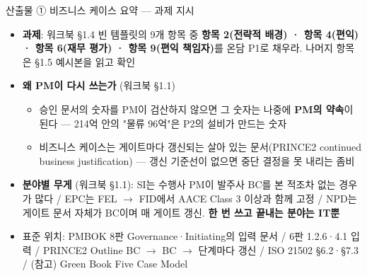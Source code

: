 \begin{frame}[allowframebreaks=1.0]{산출물 ① 비즈니스 케이스 요약 — 과제 지시}
\small
\begin{itemize}
\item\relax \textbf{과제}: 워크북 §1.4 빈 템플릿의 9개 항목 중 \textbf{항목 2(전략적 배경) · 항목 4(편익) · 항목 6(재무 평가) · 항목 9(편익 책임자)}를 온담 P1로 채우라. 나머지 항목은 §1.5 예시본을 읽고 확인
\item\relax \textbf{왜 PM이 다시 쓰는가} (워크북 §1.1)
\par\nobreak
\begin{itemize}
\item\relax 승인 문서의 숫자를 PM이 검산하지 않으면 그 숫자는 나중에 \textbf{PM의 약속}이 된다 — 214억 안의 "물류 96억"은 P2의 설비가 만드는 숫자
\item\relax 비즈니스 케이스는 게이트마다 갱신되는 살아 있는 문서(PRINCE2 continued business justification) — 갱신 기준선이 없으면 중단 결정을 못 내리는 좀비
\end{itemize}
\item\relax \textbf{분야별 무게} (워크북 §1.1): SI는 수행사 PM이 발주사 BC를 본 적조차 없는 경우가 많다 / EPC는 FEL $\rightarrow$ FID에서 AACE Class 3 이상과 함께 고정 / NPD는 게이트 문서 자체가 BC이며 매 게이트 갱신. \textbf{한 번 쓰고 끝내는 분야는 IT뿐}
\item\relax 표준 위치: PMBOK 8판 Governance·Initiating의 입력 문서 / 6판 1.2.6·4.1 입력 / PRINCE2 Outline BC $\rightarrow$ BC $\rightarrow$ 단계마다 갱신 / ISO 21502 §6.2·§7.3 / (참고) Green Book Five Case Model
\end{itemize}
\end{frame}

